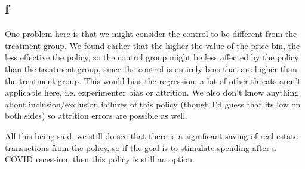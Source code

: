 \documentclass[12pt,letterpaper]{article}
\theoremstyle{definition}
\begin{document}
\subsection*{f}

One problem here is that we might consider the control to be different from the treatment group. We found earlier that the higher the value of the price bin, the less effective the policy, so the control group might be less affected by the policy than the treatment group, since the control is entirely bins that are higher than the treatment group. This would bias the regression; a lot of other threats aren't applicable here, i.e. experimenter bias or attrition. We also don't know anything about inclusion/exclusion failures of this policy (though I'd guess that its low on both sides) so attrition errors are possible as well.

All this being said, we still do see that there is a significant saving of real estate transactions from the policy, so if the goal is to stimulate spending after a COVID recession, then this policy is still an option.
\end{document}
